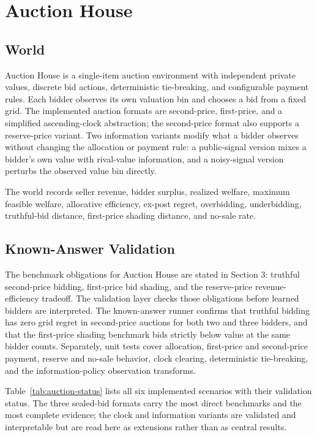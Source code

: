 \documentclass[11pt]{article}
\begin{document}
\section{Auction House}

\subsection{World}

Auction House is a single-item auction environment with independent private
values, discrete bid actions, deterministic tie-breaking, and configurable
payment rules. Each bidder observes its own valuation bin and chooses a bid from
a fixed grid. The implemented auction formats are second-price, first-price,
and a simplified ascending-clock abstraction; the second-price format also
supports a reserve-price variant. Two information variants modify what a bidder
observes without changing the allocation or payment rule: a public-signal
version mixes a bidder's own value with rival-value information, and a
noisy-signal version perturbs the observed value bin directly.

The world records seller revenue, bidder surplus, realized welfare, maximum
feasible welfare, allocative efficiency, ex-post regret, overbidding,
underbidding, truthful-bid distance, first-price shading distance, and no-sale
rate.

\subsection{Known-Answer Validation}

The benchmark obligations for Auction House are stated in Section 3: truthful
second-price bidding, first-price bid shading, and the reserve-price
revenue-efficiency tradeoff. The validation layer checks those obligations
before learned bidders are interpreted. The known-answer runner confirms that
truthful bidding has zero grid regret in second-price auctions for both two and
three bidders, and that the first-price shading benchmark bids strictly below
value at the same bidder counts. Separately, unit tests cover allocation,
first-price and second-price payment, reserve and no-sale behavior, clock
clearing, deterministic tie-breaking, and the information-policy observation
transforms.

Table~\ref{tab:auction-status} lists all six implemented scenarios with their
validation status. The three sealed-bid formats carry the most direct benchmarks
and the most complete evidence; the clock and information variants are
validated and interpretable but are read here as extensions rather than as
central results.
\end{document}
